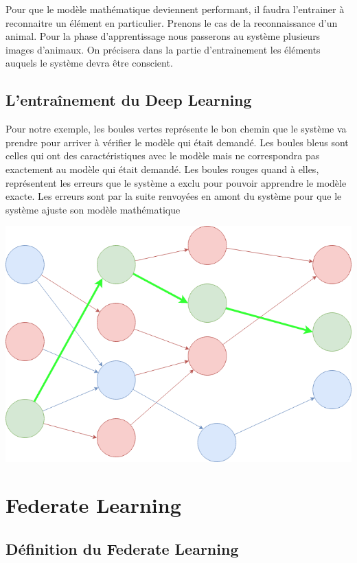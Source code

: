 \documentclass[12pt,a4paper]{report}
\begin{document}
Pour que le modèle mathématique deviennent performant, il faudra l'entrainer à reconnaitre un élément en particulier. Prenons le cas de la reconnaissance d'un animal. Pour la phase d'apprentissage nous passerons au système plusieurs images d'animaux. On précisera dans la partie d'entrainement les éléments auquels le système devra être conscient.
\pagebreak

\section{L'entraînement du Deep Learning}

Pour notre exemple, les boules vertes représente le bon chemin que le système va prendre pour arriver à vérifier le modèle qui était demandé. Les boules bleus sont celles qui ont des caractéristiques avec le modèle mais ne correspondra pas exactement au modèle qui était demandé. Les boules rouges quand à elles, représentent les erreurs que le système a exclu pour pouvoir apprendre le modèle exacte. Les erreurs sont par la suite renvoyées en amont du système pour que le système ajuste son modèle mathématique

\begin{center}
	\includegraphics[scale=0.4]{deep_learning_schema}
	\label{fig1}
\end{center}



\chapter{Federate Learning}
\section{Définition du Federate Learning}
\end{document}
